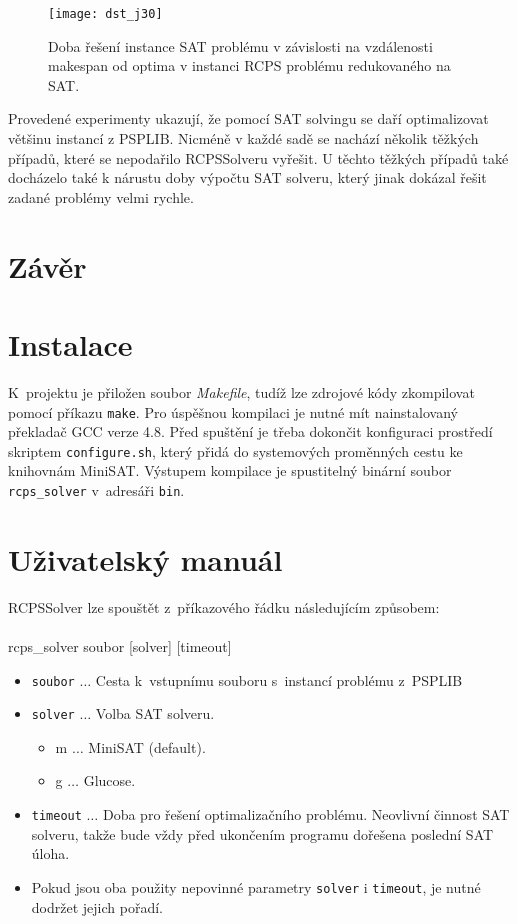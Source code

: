 \documentclass[a4paper, 12pt]{article}
\begin{document}
\begin{figure}[tb]
    \texttt{[image: dst\_j30]}
    \caption{Doba řešení instance SAT problému v závislosti na vzdálenosti makespan od optima v instanci RCPS problému redukovaného na SAT.}
    \label{pic:j30}
\end{figure}

Provedené experimenty ukazují, že pomocí SAT solvingu se daří optimalizovat většinu instancí z PSPLIB.
Nicméně v každé sadě se nachází několik těžkých případů, které se nepodařilo RCPSSolveru vyřešit.
U těchto těžkých případů také docházelo také k nárustu doby výpočtu SAT solveru, který jinak dokázal
řešit zadané problémy velmi rychle.

\section{Závěr}

\newpage
\appendix
\section{Instalace}
\label{app:install}
K~projektu je přiložen soubor \emph{Makefile}, tudíž lze zdrojové kódy zkompilovat pomocí příkazu \texttt{make}.
Pro úspěšnou kompilaci je nutné mít nainstalovaný překladač GCC verze 4.8.
Před spuštění je třeba dokončit konfiguraci prostředí skriptem \texttt{configure.sh},
který přidá do systemových proměnných cestu ke knihovnám MiniSAT.
Výstupem kompilace je spustitelný binární soubor \texttt{rcps\_solver} v~adresáři \texttt{bin}.
\section{Uživatelský manuál}
\label{app:help}
RCPSSolver lze spouštět z~příkazového řádku následujícím způsobem:
\\
\\
  rcps\_solver soubor [solver] [timeout]
  \begin{itemize}
    \item \texttt{soubor} $\ldots$ Cesta k~vstupnímu souboru s~instancí problému z~PSPLIB
    \item \texttt{solver} $\ldots$ Volba SAT solveru.  
    \begin{itemize}
        \item m $\ldots$ MiniSAT (default).
        \item g $\ldots$ Glucose.
    \end{itemize}
    \item \texttt{timeout} $\ldots$ Doba pro řešení optimalizačního problému.
    Neovlivní činnost SAT solveru, takže bude vždy před ukončením programu dořešena poslední SAT úloha.
    \item Pokud jsou oba použity nepovinné parametry \texttt{solver} i \texttt{timeout}, je nutné dodržet jejich pořadí.
  \end{itemize}
\end{document}
